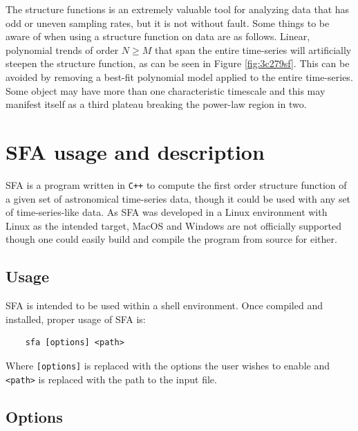 \documentclass[12pt, oneside]{smuthesis}
\begin{document}
The structure functions is an extremely valuable tool for analyzing data that has odd or uneven sampling rates, but it is not without fault. Some things to be aware of when using a structure function on data are as follows. Linear, polynomial trends of order $N\geq M$ that span the entire time-series will artificially steepen the structure function, as can be seen in Figure \ref{fig:3c279sf}. This can be avoided by removing a best-fit polynomial model applied to the entire time-series. Some object may have more than one characteristic timescale and this may manifest itself as a third plateau breaking the power-law region in two.

\section{\sc SFA usage and description} \label{usageDescription}

SFA is a program written in \verb|C++| to compute the first order structure function of a given set of astronomical time-series data, though it could be used with any set of time-series-like data. As SFA was developed in a Linux environment with Linux as the intended target, MacOS and Windows are not officially supported though one could easily build and compile the program from source for either.

\subsection{\sc Usage}

SFA is intended to be used within a shell environment. Once compiled and installed, proper usage of SFA is:
\begin{center}
	\begin{BVerbatim}
	sfa [options] <path>
	\end{BVerbatim}
\end{center}
Where \verb|[options]| is replaced with the options the user wishes to enable and \verb|<path>| is replaced with the path to the input file.

\subsection{\sc Options}
\end{document}
